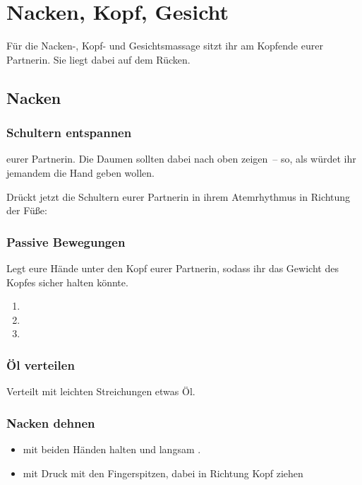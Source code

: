 \section{Nacken, Kopf, Gesicht}
\enlargethispage{1em}

Für die Nacken-, Kopf- und Gesichtsmassage sitzt ihr am Kopfende eurer Partnerin. Sie liegt dabei auf dem Rücken.

\subsection{Nacken}

\subsubsection{Schultern entspannen}
 eurer Partnerin. Die Daumen sollten dabei nach oben zeigen~-- so, als würdet ihr jemandem die Hand geben wollen.

Drückt jetzt die Schultern eurer Partnerin in ihrem Atemrhythmus in Richtung der Füße: 

\subsubsection{Passive Bewegungen}

Legt eure Hände unter den Kopf eurer Partnerin, sodass ihr das Gewicht des Kopfes sicher halten könnte.

\begin{enumerate}
  \item {}
  \item {}
  \item {}
\end{enumerate}

\subsubsection{Öl verteilen}

Verteilt mit leichten Streichungen etwas Öl.

\subsubsection{Nacken dehnen}
\begin{itemize}
  \item {} mit beiden Händen halten und langsam .
  \item {} mit Druck mit den Fingerspitzen, dabei in Richtung Kopf ziehen
\end{itemize}

